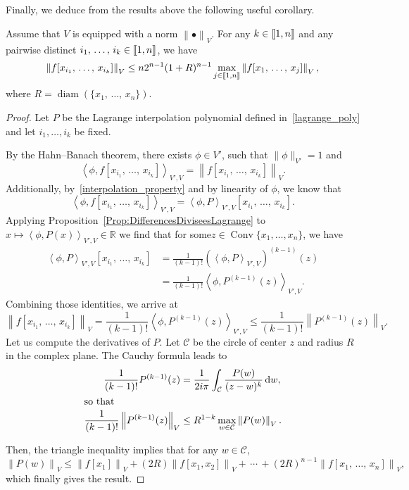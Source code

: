 \documentclass[AHL,Unicode,longabstracts]{cedram}
\DeclareMathOperator{\Conv}{Conv}
\newcommand{\llbracket}{\mathopen{[\mkern -2.7mu[}}
\newcommand{\rrbracket}{\mathclose{]\mkern -2.7mu]}}
\newcommand{\inter}[2]{\llbracket #1,#2 \rrbracket}
\newcommand{\normeV}[1]{\left\| #1 \right\|_V}
\newcommand{\dualV}[2]{\left\langle #1, #2 \right\rangle_{V',V}}
\newcommand{\CC}{\mathcal{C}}
\newcommand{\R}{\mathbb{R}}
\newcommand{\md}{\mathrm{d}}
\DeclareMathOperator{\diam}{diam}
\renewcommand{\cdot}{{\scriptstyle \bullet}}
\begin{document}
Finally, we deduce from the results above the following useful corollary.
\begin{coro}\label{Coro:esti_diff_divisees_quelconques}
Assume that $V$ is equipped with a norm $\normeV{\cdot}$. For any $k\in \inter{1}{n}$ and any pairwise distinct $i_1,\,\dotsc,\,i_k\in \inter{1}{n}$, we have
\[
\normeV{f[x_{i_1},\,\dotsc,\,x_{i_k}]} \leq n 2^{n-1} (1+R)^{n-1} \max\limits_{j\in \inter{1}{n}} \normeV{f[x_1,\,\dotsc,\,x_j]},
\]
where $R=\diam(\{x_1,\,\dotsc,\,x_n\})$.
\end{coro}

\begin{proof}
Let $P$ be the Lagrange interpolation polynomial defined in~\eqref{lagrange_poly} and let $i_1,\dotsc,i_k$ be fixed.

By the Hahn--Banach theorem, there exists $\phi\in V'$, such that $\| \phi \|_{V'}=1$ and
\[
\dualV{\phi}{f[x_{i_1},\,\dotsc,\,x_{i_k}]} = \normeV{f[x_{i_1},\,\dotsc,\,x_{i_k}]}.
\]
Additionally, by~\eqref{interpolation_property} and by linearity of $\phi$, we know that
\[
\dualV{\phi}{f[x_{i_1},\,\dotsc,\,x_{i_k}]} = \dualV{\phi}{P} [x_{i_1},\,\dotsc,\,x_{i_k}].
\]
Applying Proposition~\ref{Prop:DifferencesDiviseesLagrange} to $x\mapsto \dualV{\phi}{P(x)} \in \R$ we find that for some\linebreak$z\in \Conv \{ x_1, \dots, x_n \}$, we have
\begin{align*}
\dualV{\phi}{P} [x_{i_1},\,\dotsc,\,x_{i_k}] &= \frac{1}{(k-1)!} \left(\dualV{\phi}{P}\right)^{(k-1)}(z)
\\
&= \frac{1}{(k-1)!} \dualV{\phi}{P^{(k-1)}(z)}.
\end{align*}
Combining those identities, we arrive at
\[
\normeV{f[x_{i_1},\,\dotsc,\,x_{i_k}]} = \frac{1}{(k-1)!} \dualV{\phi}{P^{(k-1)}(z)} \leq \frac{1}{(k-1)!} \normeV{P^{(k-1)}(z)}.
\]
Let us compute the derivatives of $P$. Let $\CC$ be the circle of center $z$ and radius $R$ in the complex plane. The Cauchy formula leads to
\begin{align*}
\frac{1}{(k-1)!} P^{(k-1)}(z) &= \frac{1}{2i\pi} \int_\CC \frac{P(w)}{(z-w)^k} \, \md w,
\\
\intertext{so that}
\frac{1}{(k-1)!} \normeV{P^{(k-1)}(z)} &\leq R^{1-k} \max_{w\in \CC} \normeV{P(w)}.
\end{align*}

Then, the triangle inequality implies that for any $w \in \CC$,
\[
\normeV{P(w)} \leq \normeV{f[x_1]} + (2R) \normeV{f[x_1,x_2]} +\,\cdots\,+ (2R)^{n-1} \normeV{f[x_1,\,\dotsc,\,x_n]},
\]
which finally gives the result.
\end{proof}
\end{document}
